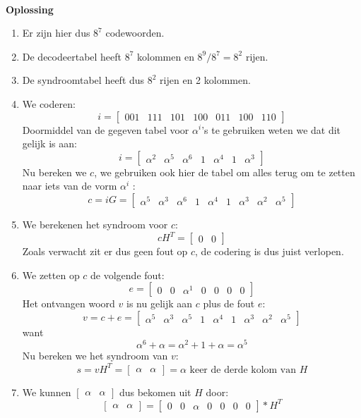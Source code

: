 \documentclass[11pt,a4paper,titlepage]{article}
\begin{document}
\noindent \\ \textbf{Oplossing}
\begin{enumerate}[label=(\alph*)]
	\item Er zijn hier dus $8^7$ codewoorden.
	\item De decodeertabel heeft $8^7$ kolommen en $8^9/8^7 = 8^2$ rijen.
	\item De syndroomtabel heeft dus $8^2$ rijen en 2 kolommen.
	\item We coderen:
			$$i = \begin{bmatrix}001&111&101&100&011&100&110\end{bmatrix}$$
		Doormiddel van de gegeven tabel voor $\alpha ^i$'s te gebruiken weten we dat dit gelijk is aan:
			$$i = \begin{bmatrix}\alpha ^2&\alpha ^5 &\alpha ^6&1&\alpha ^4 &1&\alpha ^3\end{bmatrix}$$
		Nu bereken we $c$, we gebruiken ook hier de tabel om alles terug om te zetten naar iets van de vorm $\alpha ^i$ :
			$$c = iG = \begin{bmatrix}\alpha ^5&\alpha ^3&\alpha ^6&1&\alpha ^4&1&\alpha ^3&\alpha ^2&\alpha ^5\end{bmatrix}$$
	\item We berekenen het syndroom voor $c$:
			$$cH^T =  \begin{bmatrix}0&0\end{bmatrix}$$
		Zoals verwacht zit er dus geen fout op $c$, de codering is dus juist verlopen. 
	\item We zetten op $c$ de volgende fout:
			$$e = \begin{bmatrix}0&0 &\alpha ^1&0&0&0&0\end{bmatrix}$$
		Het ontvangen woord $v$ is nu gelijk aan $c$ plus de fout $e$:
			$$v = c + e = \begin{bmatrix}\alpha ^5&\alpha ^3&\alpha ^5&1&\alpha ^4&1&\alpha ^3&\alpha ^2&\alpha ^5\end{bmatrix}$$
		want
			$$\alpha ^6 + \alpha = \alpha ^2 + 1 +  \alpha = \alpha ^5$$
		Nu bereken we het syndroom van $v$:
			$$s = vH^T =  \begin{bmatrix}\alpha &\alpha\end{bmatrix} = \alpha \text{ keer de derde kolom van } H $$
	\item We kunnen $\begin{bmatrix}\alpha &\alpha\end{bmatrix}$ dus bekomen uit $H$ door:
			$$\begin{bmatrix}\alpha &\alpha\end{bmatrix} = \begin{bmatrix}0&0 &\alpha&0&0&0&0\end{bmatrix} * H^T$$

\end{enumerate}
\end{document}
